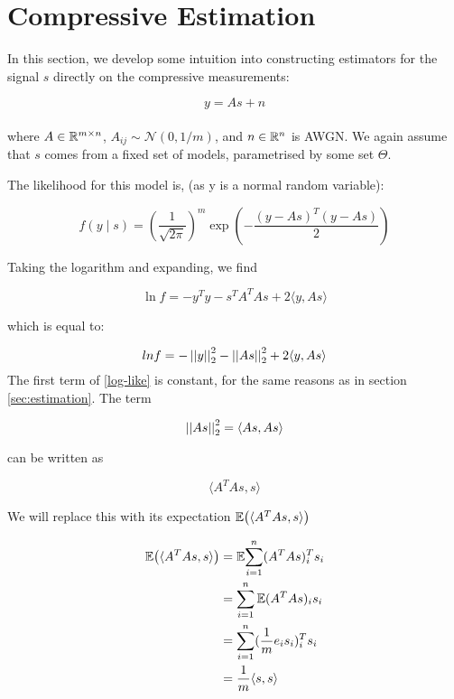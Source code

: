 \section{Compressive Estimation} \label{sec:estimation}
In this section, we develop some intuition into constructing estimators for the signal \(s\) directly on the compressive measurements:

\begin{equation}
y = As + n
\end{equation}
\\
where \(A \in {\mathbb{R}}^{m \times n} \), \(A_{ij} \sim \mathcal{N}\left(0,1/m\right)\), and \(n \in {\mathbb{R}}^n\) is AWGN. We again assume that \(s\) comes from a fixed set of models, parametrised by some set \(\Theta\). 

The likelihood for this model is, (as y is a normal random variable):

\begin{equation}
f\left(y \mid s\right) = \left(\frac{1}{\sqrt{2\pi}} \right)^m \exp{\left( - \frac{\left(y-As\right)^T  \left(y-As\right)}{2} \right)}
\end{equation}

Taking the logarithm and expanding, we find

\begin{equation}
\ln{f} = -y^Ty - s^TA^TAs + 2\langle y, As \rangle
\end{equation}

which is equal to:

\begin{equation}
ln{f} = - \left|\left|y\right|\right|_2^2 - \left|\left|As\right|\right|_2^2 + 2\langle y, As \rangle
\label{log-like}
\end{equation}
The first term of \eqref{log-like} is constant, for the same reasons as in section \eqref{sec:estimation}. The term 

\begin{equation}
\left|\left|As\right|\right|^2_2 = \langle As, As\rangle
\end{equation}

can be written as 

\begin{equation}
\langle A^T As, s\rangle
\end{equation}

We will replace this with its expectation \({\mathbb{E}}{\left( \langle A^T As, s\rangle \right)}\)

\begin{align*}
{\mathbb{E}}{\left(\langle A^T As, s\rangle\right)} &=  {\mathbb{E}}{\sum_{i=1}^n (A^TAs)^T_i s_i} \\
&= \sum_{i=1}^n {\mathbb{E}}{(A^TAs)_i s_i} \\
&= \sum_{i=1}^n (\frac{1}{m}e_i s_i)^T_i s_i \\
&= \frac{1}{m} \langle s, s \rangle
\end{align*}

